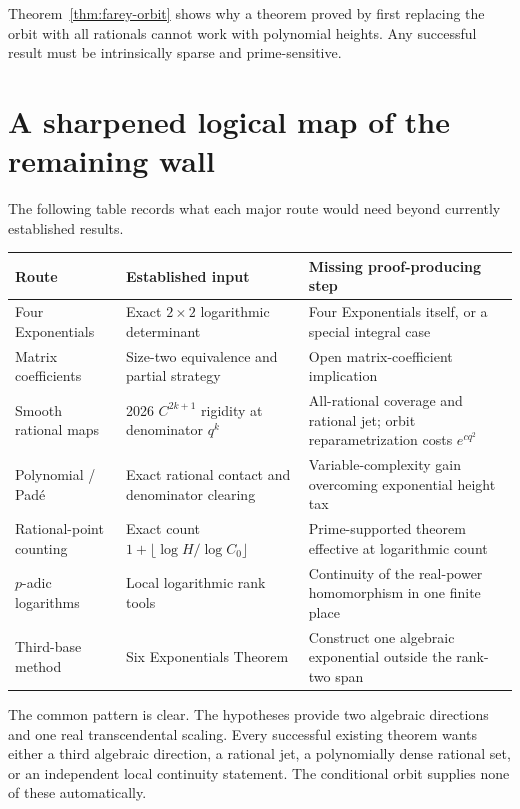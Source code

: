 \documentclass[11pt]{article}
\theoremstyle{definition}
\theoremstyle{remark}
\begin{document}
Theorem~\ref{thm:farey-orbit} shows why a theorem proved by first replacing the orbit with all
rationals cannot work with polynomial heights.  Any successful result must be intrinsically
sparse and prime-sensitive.

\section{A sharpened logical map of the remaining wall}
\label{sec:map}

The following table records what each major route would need beyond currently established
results.

\begin{center}
\begin{tabular}{p{}p{}p{}}
\toprule
Route & Established input & Missing proof-producing step\\
\midrule
Four Exponentials & Exact $2\times2$ logarithmic determinant & Four Exponentials itself, or a special integral case\\
Matrix coefficients & Size-two equivalence and partial strategy & Open matrix-coefficient implication\\
Smooth rational maps & 2026 $C^{2k+1}$ rigidity at denominator $q^k$ & All-rational coverage and rational jet; orbit reparametrization costs $e^{cq^2}$\\
Polynomial / Pad\'e & Exact rational contact and denominator clearing & Variable-complexity gain overcoming exponential height tax\\
Rational-point counting & Exact count $1+\lfloor\log H/\log C_0\rfloor$ & Prime-supported theorem effective at logarithmic count\\
$p$-adic logarithms & Local logarithmic rank tools & Continuity of the real-power homomorphism in one finite place\\
Third-base method & Six Exponentials Theorem & Construct one algebraic exponential outside the rank-two span\\
\bottomrule
\end{tabular}
\end{center}

The common pattern is clear.  The hypotheses provide two algebraic directions and one real
transcendental scaling.  Every successful existing theorem wants either a third algebraic
direction, a rational jet, a polynomially dense rational set, or an independent local
continuity statement.  The conditional orbit supplies none of these automatically.
\end{document}

